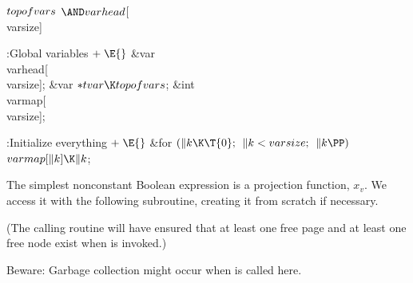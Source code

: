 \Y\B\4\D$\\{topofvars}$ \5
${\AND}\\{varhead}{}$[\\{varsize}]\par
\Y\B\4:Global variables\X${}\mathrel+\E{}$\6
\&{var} \\{varhead}[\\{varsize}];\6
\&{var} ${}{*}\\{tvar}\K\\{topofvars}{}$;\6
\&{int} \\{varmap}[\\{varsize}];\par
\fi

\B{}:Initialize everything\X${}\mathrel+\E{}$\6
\&{for} ${}(\|k\K\T{0};{}$ ${}\|k<\\{varsize};{}$ ${}\|k\PP){}$\1\5
${}\\{varmap}[\|k]\K\|k{}$;\2\par
\fi

The simplest nonconstant Boolean expression is a projection function,
$x_v$.
We access it with the following subroutine, creating it from scratch
if necessary.

(The calling routine will have ensured that at least one free page
and at least one free node exist when  is invoked.)

Beware: Garbage collection might occur when  is called
here.


